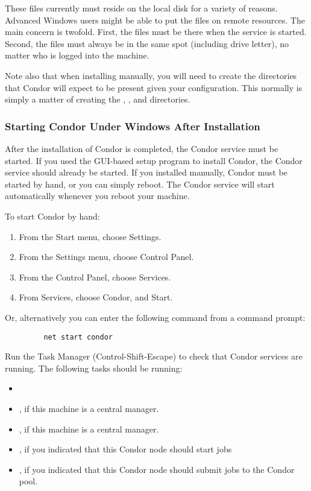\begin{description}
These files currently must reside on the local disk for a variety of reasons.
Advanced Windows users might be able to put the files on remote resources.
The main concern is twofold.  First, the files must be there when the service
is started.  Second, the files must always be in the same spot (including
drive letter), no matter who is logged into the machine.  

Note also that when installing manually, you will need to create the
directories that Condor will expect to be present given your
configuration. This normally is simply a matter of creating the
, , and  directories.

\end{description}


\subsubsection{\label{nt-installed-now-what}
Starting Condor Under Windows After Installation}

After the installation of Condor is completed, the Condor service
must be started.  If you used the GUI-based setup program to install
Condor, the Condor service should already be started.  If you installed
manually, Condor must
be started by hand, or you can simply reboot. \Note The Condor service
will start automatically whenever you reboot your machine.

To start Condor by hand:
\begin{enumerate}
\item From the Start menu, choose Settings.
\item From the Settings menu, choose Control Panel.
\item From the Control Panel, choose Services.
\item From Services, choose Condor, and Start.
\end{enumerate}

Or, alternatively you can enter the following command from a command prompt:
\begin{verbatim}
         net start condor
\end{verbatim}

Run the Task Manager (Control-Shift-Escape) to check that Condor
services are running.  The following tasks should
be running:  
\begin{itemize}
\item {}
\item {}, if this machine is a central manager.
\item {}, if this machine is a central manager.
\item {}, if you indicated that this Condor node should start jobs
\item {}, if you indicated that this Condor node should submit jobs
to the Condor pool.
\end{itemize}

